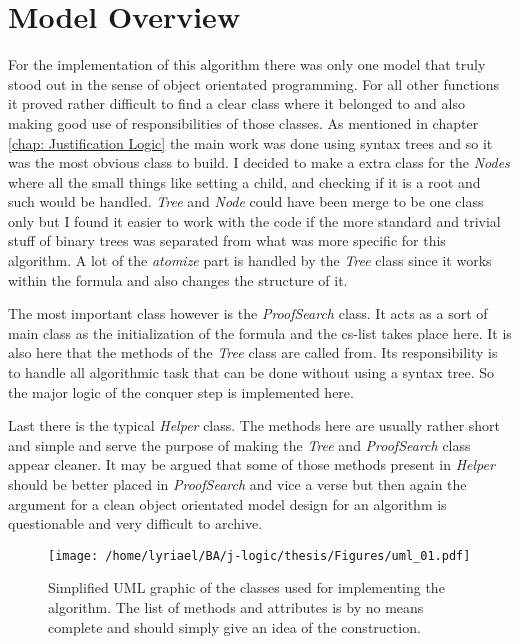 
\section{Model Overview}
For the implementation of this algorithm there was only one model that truly stood out in the sense of object orientated programming. For all other functions it proved rather difficult to find a clear class where it belonged to and also making good use of responsibilities of those classes. As mentioned in chapter \ref{chap: Justification Logic} the main work was done using syntax trees and so it was the most obvious class to build. I decided to make a extra class for the \emph{Nodes} where all the small things like setting a child, and checking if it is a root and such would be handled. \emph{Tree} and \emph{Node} could have been merge to be one class only but I found it easier to work with the code if the more standard and trivial stuff of binary trees was separated from what was more specific for this algorithm. A lot of the \emph{atomize} part is handled by the \emph{Tree} class since it works within the formula and also changes the structure of it.

The most important class however is the \emph{ProofSearch} class. It acts as a sort of main class as the initialization of the formula and the cs-list takes place here. It is also here that the methods of the \emph{Tree} class are called from. Its responsibility is to handle all algorithmic task that can be done without using a syntax tree. So the major logic of the conquer step is implemented here.

Last there is the typical \emph{Helper} class. The methods here are usually rather short  and simple and serve the purpose of making the \emph{Tree} and \emph{ProofSearch} class appear cleaner. It may be argued that some of those methods present in \emph{Helper} should be better placed in \emph{ProofSearch} and vice a verse but then again the argument for a clean object orientated model design for an algorithm is questionable and very difficult to archive.

\begin{figure}[H]
	\texttt{[image: /home/lyriael/BA/j-logic/thesis/Figures/uml\_01.pdf]}
	\caption{Simplified UML graphic of the classes used for implementing the algorithm. The list of methods and attributes is by no means complete and should simply give an idea of the construction.}
	\label{uml}
\end{figure}

